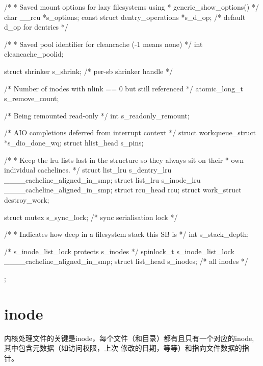 \begin{code}
{	/*
	 * Saved mount options for lazy filesystems using
	 * generic_show_options()
	 */
	char __rcu *s_options;
	const struct dentry_operations *s_d_op; /* default d_op for dentries */

	/*
	 * Saved pool identifier for cleancache (-1 means none)
	 */
	int cleancache_poolid;

	struct shrinker s_shrink;	/* per-sb shrinker handle */

	/* Number of inodes with nlink == 0 but still referenced */
	atomic_long_t s_remove_count;

	/* Being remounted read-only */
	int s_readonly_remount;

	/* AIO completions deferred from interrupt context */
	struct workqueue_struct *s_dio_done_wq;
	struct hlist_head s_pins;

	/*
	 * Keep the lru lists last in the structure so they always sit on their
	 * own individual cachelines.
	 */
	struct list_lru		s_dentry_lru ____cacheline_aligned_in_smp;
	struct list_lru		s_inode_lru ____cacheline_aligned_in_smp;
	struct rcu_head		rcu;
	struct work_struct	destroy_work;

	struct mutex		s_sync_lock;	/* sync serialisation lock */

	/*
	 * Indicates how deep in a filesystem stack this SB is
	 */
	int s_stack_depth;

	/* s_inode_list_lock protects s_inodes */
	spinlock_t		s_inode_list_lock ____cacheline_aligned_in_smp;
	struct list_head	s_inodes;	/* all inodes */
};
        
\end{code}



\section{inode}

内核处理文件的关键是inode，每个文件（和目录）都有且只有一个对应的inode,其中包含元数据（如访问权限，上次
修改的日期，等等）和指向文件数据的指针。

